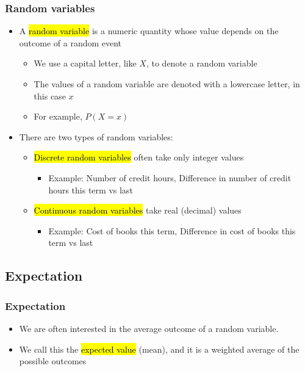 \documentclass[slidestop,compress,mathserif]{beamer}
\begin{document}
\begin{frame}
\frametitle{Random variables}

\begin{itemize}

\item A \hl{random variable} is a numeric quantity whose value depends on the outcome of a random event
\begin{itemize}
\item We use a capital letter, like $X$, to denote a random variable
\item The values of a random variable are denoted with a lowercase letter, in this case $x$
\item For example, $P(X = x)$
\end{itemize}

\item There are two types of random variables:
\begin{itemize}
\item \hl{Discrete random variables} often take only integer values
\begin{itemize}
\item Example: Number of credit hours, Difference in number of credit hours this term vs last
\end{itemize}
\item \hl{Continuous random variables} take real (decimal) values
\begin{itemize}
\item Example: Cost of books this term, Difference in cost of books this term vs last
\end{itemize}
\end{itemize}

\end{itemize}

\end{frame}


\subsection{Expectation}


\begin{frame}
\frametitle{Expectation}

\begin{itemize}

\item We are often interested in the average outcome of a random variable.

\item We call this the \hl{expected value} (mean), and it is a weighted average of the possible outcomes
\formula{\[\mu = E(X) = \sum_{i = 1}^k x_i ~ P(X = x_i)\]}

\end{itemize}

\end{frame}
\end{document}
